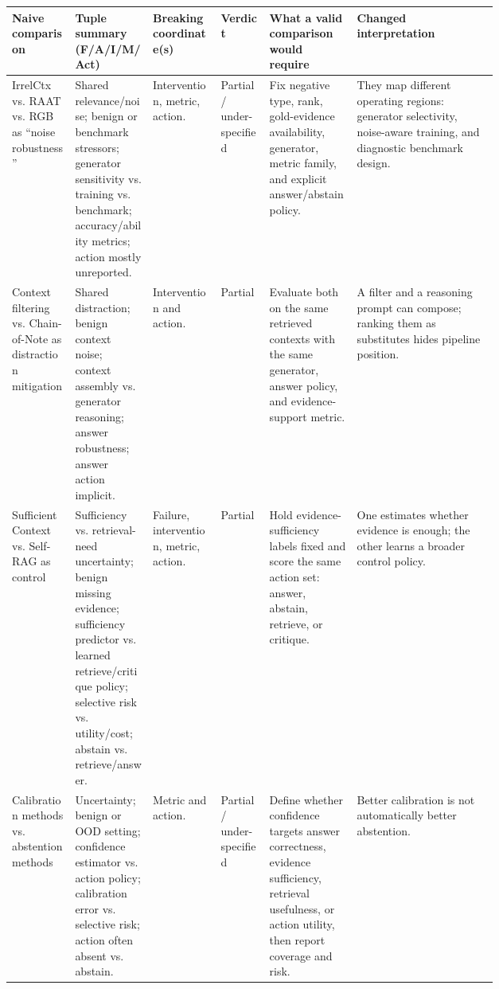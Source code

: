 \begin{table}[t]
\centering
\tiny
\renewcommand{\arraystretch}{0.86}
\begin{tabularx}{\linewidth}{>{\raggedright\arraybackslash}p{0.13\linewidth}>{\raggedright\arraybackslash}p{0.16\linewidth}>{\raggedright\arraybackslash}p{0.14\linewidth}>{\raggedright\arraybackslash}p{0.10\linewidth}>{\raggedright\arraybackslash}p{0.18\linewidth}X}
\toprule
\textbf{Naive comparison} & \textbf{Tuple summary (F/A/I/M/Act)} & \textbf{Breaking coordinate(s)} & \textbf{Verdict} & \textbf{What a valid comparison would require} & \textbf{Changed interpretation} \\
\midrule
IrrelCtx vs. RAAT vs. RGB as ``noise robustness'' & Shared relevance/noise; benign or benchmark stressors; generator sensitivity vs. training vs. benchmark; accuracy/ability metrics; action mostly unreported. & Intervention, metric, action. & Partial / under-specified & Fix negative type, rank, gold-evidence availability, generator, metric family, and explicit answer/abstain policy. & They map different operating regions: generator selectivity, noise-aware training, and diagnostic benchmark design. \\
Context filtering vs. Chain-of-Note as distraction mitigation & Shared distraction; benign context noise; context assembly vs. generator reasoning; answer robustness; answer action implicit. & Intervention and action. & Partial & Evaluate both on the same retrieved contexts with the same generator, answer policy, and evidence-support metric. & A filter and a reasoning prompt can compose; ranking them as substitutes hides pipeline position. \\
Sufficient Context vs. Self-RAG as control & Sufficiency vs. retrieval-need uncertainty; benign missing evidence; sufficiency predictor vs. learned retrieve/critique policy; selective risk vs. utility/cost; abstain vs. retrieve/answer. & Failure, intervention, metric, action. & Partial & Hold evidence-sufficiency labels fixed and score the same action set: answer, abstain, retrieve, or critique. & One estimates whether evidence is enough; the other learns a broader control policy. \\
Calibration methods vs. abstention methods & Uncertainty; benign or OOD setting; confidence estimator vs. action policy; calibration error vs. selective risk; action often absent vs. abstain. & Metric and action. & Partial / under-specified & Define whether confidence targets answer correctness, evidence sufficiency, retrieval usefulness, or action utility, then report coverage and risk. & Better calibration is not automatically better abstention. \\

\end{tabularx}
\end{table}
